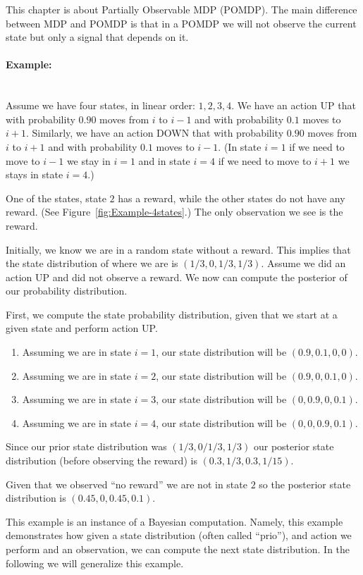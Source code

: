 
This chapter is about Partially Observable MDP (POMDP). The
main difference between MDP and POMDP is that in a POMDP we will not observe the current state but
only a signal that depends on it.


\paragraph{Example:}\ \\
Assume we have four states, in linear order: $1,2,3,4$. We have an
action UP that with probability $0.90$ moves from $i$ to $i-1$ and
with probability $0.1$ moves to $i+1$. Similarly, we have an action
DOWN that with probability $0.90$ moves from $i$ to $i+1$ and with
probability $0.1$ moves to $i-1$. (In state $i=1$ if we need to move
to $i-1$ we stay in $i=1$ and in state $i=4$ if we need to move to
$i+1$ we stays in state $i=4$.)

One of the states, state $2$ has a reward, while the other states do not have any reward. (See Figure~\ref{fig:Example-4states}.) The only observation we see is the reward.

Initially, we know we are in a random state without a reward. This implies that the state distribution of where we are is $(1/3,0,1/3,1/3)$.
Assume we did an action UP and did not observe a reward. We now can
compute the posterior of our probability distribution.

First, we compute the state probability distribution, given that we start at a given state and perform action UP.
\begin{enumerate}
\item
Assuming we are in state $i=1$, our state distribution will be
$(0.9,0.1,0,0)$.
\item
Assuming we are in state $i=2$, our state distribution will be
$(0.9,0,0.1,0)$.
\item
Assuming we are in state $i=3$, our state distribution will be
$(0,0.9,0,0.1)$.
\item
Assuming we are in state $i=4$, our state distribution will be
$(0,0,0.9,0.1)$.
\end{enumerate}

Since our prior state distribution was $(1/3,0/1/3,1/3)$ our
posterior state distribution (before observing the reward) is
$(0.3,1/3,0.3,1/15)$.

Given that we observed ``no reward'' we are not in state $2$ so the
posterior state distribution is $(0.45,0,0.45,0.1)$.

This example is an instance of a Bayesian computation. Namely, this example demonstrates how given a state distribution (often called ``prio''), and action we perform and an observation, we can compute the next state distribution. In the following we will generalize this example.

